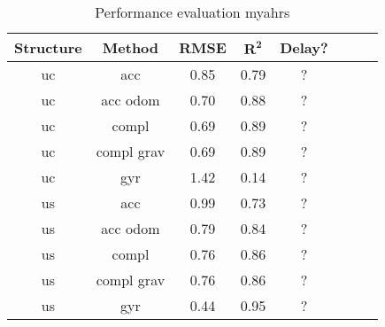 \begin{table}[htbp]
	\centering
	\caption{Performance evaluation myahrs}
	\label{tab:eval_table}
	\begin{tabular}[t]{cccccccc}
		\toprule
		\textbf{Structure} & \textbf{Method} & \textbf{RMSE} & $\mathbf{R^2}$ & \textbf{Delay?} \\
		\midrule
		uc                 & acc             & 0.85          & 0.79           & ?               \\
		uc                 & acc odom        & 0.70          & 0.88           & ?               \\
		uc                 & compl           & 0.69          & 0.89           & ?               \\
		uc                 & compl grav      & 0.69          & 0.89           & ?               \\
		uc                 & gyr             & 1.42          & 0.14           & ?               \\
		us                 & acc             & 0.99          & 0.73           & ?               \\
		us                 & acc odom        & 0.79          & 0.84           & ?               \\
		us                 & compl           & 0.76          & 0.86           & ?               \\
		us                 & compl grav      & 0.76          & 0.86           & ?               \\
		us                 & gyr             & 0.44          & 0.95           & ?               \\
		\bottomrule
	\end{tabular}
\end{table}
